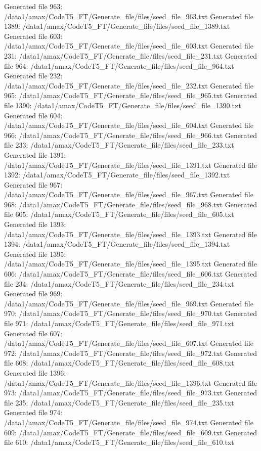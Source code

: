 Generated file 963: /data1/amax/CodeT5_FT/Generate_file/files/seed_file_963.txt
Generated file 1389: /data1/amax/CodeT5_FT/Generate_file/files/seed_file_1389.txt
Generated file 603: /data1/amax/CodeT5_FT/Generate_file/files/seed_file_603.txt
Generated file 231: /data1/amax/CodeT5_FT/Generate_file/files/seed_file_231.txt
Generated file 964: /data1/amax/CodeT5_FT/Generate_file/files/seed_file_964.txt
Generated file 232: /data1/amax/CodeT5_FT/Generate_file/files/seed_file_232.txt
Generated file 965: /data1/amax/CodeT5_FT/Generate_file/files/seed_file_965.txt
Generated file 1390: /data1/amax/CodeT5_FT/Generate_file/files/seed_file_1390.txt
Generated file 604: /data1/amax/CodeT5_FT/Generate_file/files/seed_file_604.txt
Generated file 966: /data1/amax/CodeT5_FT/Generate_file/files/seed_file_966.txt
Generated file 233: /data1/amax/CodeT5_FT/Generate_file/files/seed_file_233.txt
Generated file 1391: /data1/amax/CodeT5_FT/Generate_file/files/seed_file_1391.txt
Generated file 1392: /data1/amax/CodeT5_FT/Generate_file/files/seed_file_1392.txt
Generated file 967: /data1/amax/CodeT5_FT/Generate_file/files/seed_file_967.txt
Generated file 968: /data1/amax/CodeT5_FT/Generate_file/files/seed_file_968.txt
Generated file 605: /data1/amax/CodeT5_FT/Generate_file/files/seed_file_605.txt
Generated file 1393: /data1/amax/CodeT5_FT/Generate_file/files/seed_file_1393.txt
Generated file 1394: /data1/amax/CodeT5_FT/Generate_file/files/seed_file_1394.txt
Generated file 1395: /data1/amax/CodeT5_FT/Generate_file/files/seed_file_1395.txt
Generated file 606: /data1/amax/CodeT5_FT/Generate_file/files/seed_file_606.txt
Generated file 234: /data1/amax/CodeT5_FT/Generate_file/files/seed_file_234.txt
Generated file 969: /data1/amax/CodeT5_FT/Generate_file/files/seed_file_969.txt
Generated file 970: /data1/amax/CodeT5_FT/Generate_file/files/seed_file_970.txt
Generated file 971: /data1/amax/CodeT5_FT/Generate_file/files/seed_file_971.txt
Generated file 607: /data1/amax/CodeT5_FT/Generate_file/files/seed_file_607.txt
Generated file 972: /data1/amax/CodeT5_FT/Generate_file/files/seed_file_972.txt
Generated file 608: /data1/amax/CodeT5_FT/Generate_file/files/seed_file_608.txt
Generated file 1396: /data1/amax/CodeT5_FT/Generate_file/files/seed_file_1396.txt
Generated file 973: /data1/amax/CodeT5_FT/Generate_file/files/seed_file_973.txt
Generated file 235: /data1/amax/CodeT5_FT/Generate_file/files/seed_file_235.txt
Generated file 974: /data1/amax/CodeT5_FT/Generate_file/files/seed_file_974.txt
Generated file 609: /data1/amax/CodeT5_FT/Generate_file/files/seed_file_609.txt
Generated file 610: /data1/amax/CodeT5_FT/Generate_file/files/seed_file_610.txt
